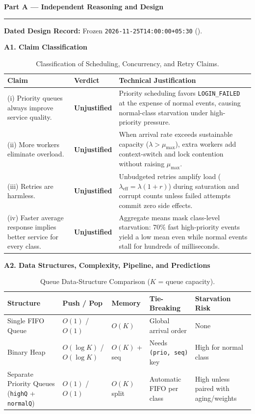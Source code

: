 \documentclass[11pt]{article}
\newcommand{\partheader}[1]{%
    \vspace{0.9em}%
    {\noindent\fontsize{13.5}{16}\selectfont\textbf{\color{accentblue}#1}\par}%
    \vspace{0.2em}\hrule\vspace{0.65em}%
}
\newcommand{\subhead}[1]{\vspace{0.55em}\noindent\textbf{\large #1}\par\vspace{0.22em}}
\begin{document}
\partheader{Part A --- Independent Reasoning and Design}
\textbf{Dated Design Record:} Frozen \texttt{2026-11-25T14:00:00+05:30} ().

\subhead{A1. Claim Classification}
\begin{table}[htbp]
\centering
\caption{Classification of Scheduling, Concurrency, and Retry Claims.}
\footnotesize
\begin{tabularx}{\textwidth}{@{} >{\raggedright\arraybackslash}p{4.3cm} >{\raggedright\arraybackslash}p{2.0cm} >{\raggedright\arraybackslash}X @{}}
\toprule
\textbf{Claim} & \textbf{Verdict} & \textbf{Technical Justification} \\
\midrule
(i) Priority queues always improve service quality. & \textbf{Unjustified} & Priority scheduling favors \texttt{LOGIN\_FAILED} at the expense of normal events, causing normal-class starvation under high-priority pressure. \\
(ii) More workers eliminate overload. & \textbf{Unjustified} & When arrival rate exceeds sustainable capacity ($\lambda > \mu_{\max}$), extra workers add context-switch and lock contention without raising $\mu_{\max}$. \\
(iii) Retries are harmless. & \textbf{Unjustified} & Unbudgeted retries amplify load ($\lambda_{\text{eff}} = \lambda(1+r)$) during saturation and corrupt counts unless failed attempts commit zero side effects. \\
(iv) Faster average response implies better service for every class. & \textbf{Unjustified} & Aggregate means mask class-level starvation: 70\% fast high-priority events yield a low mean even while normal events stall for hundreds of milliseconds. \\
\bottomrule
\end{tabularx}
\end{table}

\subhead{A2. Data Structures, Complexity, Pipeline, and Predictions}
\begin{table}[htbp]
\centering
\caption{Queue Data-Structure Comparison ($K$ = queue capacity).}
\footnotesize
\begin{tabularx}{\textwidth}{@{} >{\raggedright\arraybackslash}p{3.4cm} l l >{\raggedright\arraybackslash}p{3.3cm} >{\raggedright\arraybackslash}X @{}}
\toprule
\textbf{Structure} & \textbf{Push / Pop} & \textbf{Memory} & \textbf{Tie-Breaking} & \textbf{Starvation Risk} \\
\midrule
Single FIFO Queue & $O(1)$ / $O(1)$ & $O(K)$ & Global arrival order & None \\
Binary Heap & $O(\log K)$ / $O(\log K)$ & $O(K)$ + seq & Needs \texttt{(prio, seq)} key & High for normal class \\
Separate Priority Queues (\texttt{highQ} + \texttt{normalQ}) & $O(1)$ / $O(1)$ & $O(K)$ split & Automatic FIFO per class & High unless paired with aging/weights \\
\bottomrule
\end{tabularx}
\end{table}
\end{document}
